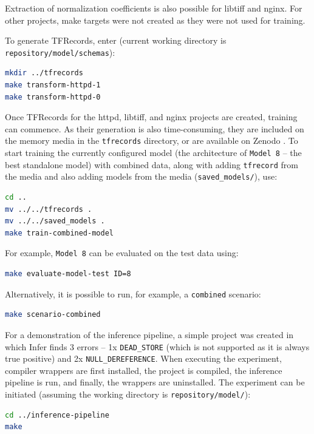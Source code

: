 Extraction of normalization coefficients is also possible for libtiff and nginx. For other projects, make targets were not created as they were not used for training.

To generate TFRecords, enter (current working directory is \texttt{repository/model/schemas}):
\begin{lstlisting}[language=bash, xleftmargin=2em]
mkdir ../tfrecords
make transform-httpd-1
make transform-httpd-0
\end{lstlisting}

Once TFRecords for the httpd, libtiff, and nginx projects are created, training can commence. As their generation is also time-consuming, they are included on the memory media in the \texttt{tfrecords} directory, or are available on Zenodo \cite{zenodo-ecpg}. To start training the currently configured model (the architecture of \texttt{Model 8} -- the best standalone model) with combined data, along with adding \texttt{tfrecord} from the media and also adding models from the media (\texttt{saved\_models/}), use:
\begin{lstlisting}[language=bash, xleftmargin=2em]
cd ..
mv ../../tfrecords .
mv ../../saved_models . 
make train-combined-model
\end{lstlisting}

For example, \texttt{Model 8} can be evaluated on the test data using:
\begin{lstlisting}[language=bash, xleftmargin=2em]
make evaluate-model-test ID=8
\end{lstlisting}

Alternatively, it is possible to run, for example, a \texttt{combined} scenario:
\begin{lstlisting}[language=bash, xleftmargin=2em]
make scenario-combined
\end{lstlisting}

For a demonstration of the inference pipeline, a simple project was created in which Infer finds 3 errors -- 1x \texttt{DEAD\_STORE} (which is not supported as it is always true positive) and 2x \texttt{NULL\_DEREFERENCE}. When executing the experiment, compiler wrappers are first installed, the project is compiled, the inference pipeline is run, and finally, the wrappers are uninstalled. The experiment can be initiated (assuming the working directory is \texttt{repository/model/}):
\begin{lstlisting}[language=bash, xleftmargin=2em]
cd ../inference-pipeline
make
\end{lstlisting}

